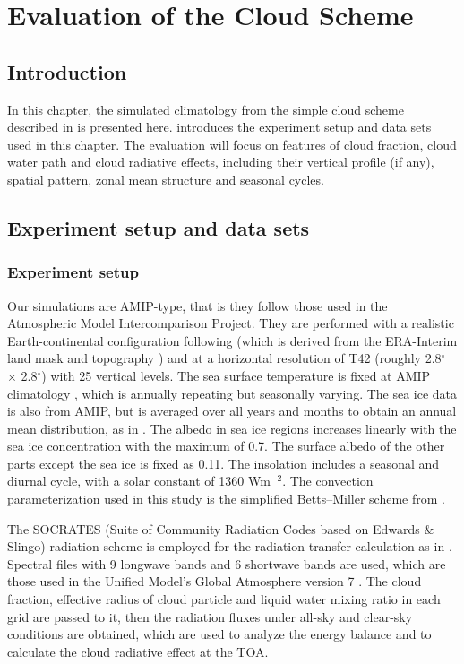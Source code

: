 \chapter{Evaluation of the Cloud Scheme}

\section{Introduction}

In this chapter, the simulated climatology from the simple cloud scheme described in  is presented here.  introduces the experiment setup and data sets used in this chapter. The evaluation will focus on features of cloud fraction, cloud water path and cloud radiative effects, including their vertical profile (if any), spatial pattern, zonal mean structure and seasonal cycles.


\section{Experiment setup and data sets}
\label{sec:exp_setup_and_dataset}

\subsection{Experiment setup}

Our simulations are AMIP-type, that is they follow those used in the Atmospheric Model Intercomparison Project. They are performed with a realistic Earth-continental configuration following \citet{Thomson2018} (which is derived from the ERA-Interim land mask and topography \citep{Dee2011}) and at a horizontal resolution of T42 (roughly 2.8$^\circ$ $\times$ 2.8$^\circ$) with 25 vertical levels. The sea surface temperature is fixed at AMIP climatology \citep{Taylor2000sea}, which is annually repeating but seasonally varying. The sea ice data is also from AMIP, but is averaged over all years and months to obtain an annual mean distribution, as in \citet{Thomson2018}. The albedo in sea ice regions increases linearly with the sea ice concentration with the maximum of 0.7. The surface albedo of the other parts except the sea ice is fixed as 0.11. The insolation includes a seasonal and diurnal cycle, with a solar constant of 1360 Wm$^{-2}$. The convection parameterization used in this study is the simplified Betts--Miller scheme from \citet{Frierson2007}. 

The SOCRATES (Suite of Community Radiation Codes based on Edwards \& Slingo) radiation scheme \citep{Edwards1996, Manners2015} is employed for the radiation transfer calculation as in \citet{Thomson2019}. Spectral files with 9 longwave bands and 6 shortwave bands are used, which are those used in the Unified Model's Global Atmosphere version 7 \citep{Walters2019}. The cloud fraction, effective radius of cloud particle and liquid water mixing ratio in each grid are passed to it, then the radiation fluxes under all-sky and clear-sky conditions are obtained, which are used to analyze the energy balance and to calculate the cloud radiative effect \citep{Ramanathan1989, Li2017} at the TOA.

